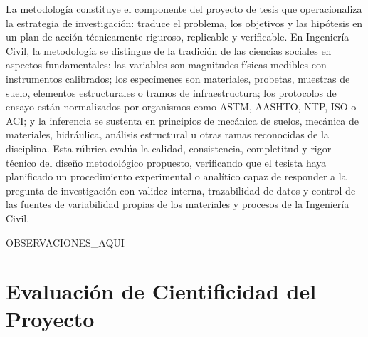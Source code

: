 \documentclass[12pt,a4paper]{report}
\begin{document}
La metodología constituye el componente del proyecto de tesis que operacionaliza la estrategia de investigación: traduce el problema, los objetivos y las hipótesis en un plan de acción técnicamente riguroso, replicable y verificable. En Ingeniería Civil, la metodología se distingue de la tradición de las ciencias sociales en aspectos fundamentales: las variables son magnitudes físicas medibles con instrumentos calibrados; los especímenes son materiales, probetas, muestras de suelo, elementos estructurales o tramos de infraestructura; los protocolos de ensayo están normalizados por organismos como ASTM, AASHTO, NTP, ISO o ACI; y la inferencia se sustenta en principios de mecánica de suelos, mecánica de materiales, hidráulica, análisis estructural u otras ramas reconocidas de la disciplina. Esta rúbrica evalúa la calidad, consistencia, completitud y rigor técnico del diseño metodológico propuesto, verificando que el tesista haya planificado un procedimiento experimental o analítico capaz de responder a la pregunta de investigación con validez interna, trazabilidad de datos y control de las fuentes de variabilidad propias de los materiales y procesos de la Ingeniería Civil.\par


{{OBSERVACIONES_AQUI}}


\section{Evaluación de Cientificidad del Proyecto}
\end{document}

